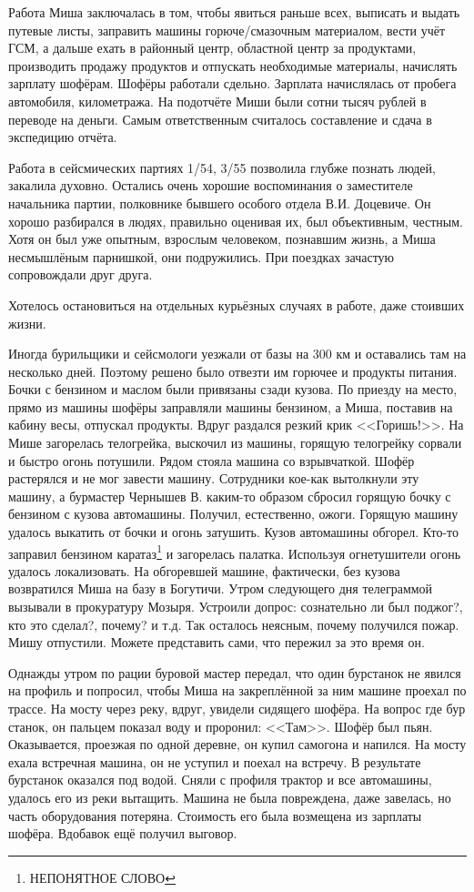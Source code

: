 Работа Миша заключалась в том, чтобы явиться раньше всех, выписать и выдать путевые листы, заправить машины горюче\-/смазочным материалом, вести учёт ГСМ, а дальше ехать в районный центр, областной центр за продуктами, производить продажу продуктов и отпускать необходимые материалы, начислять зарплату шофёрам. Шофёры работали сдельно. Зарплата начислялась от пробега автомобиля, километража. На подотчёте Миши были сотни тысяч рублей в переводе на деньги. Самым ответственным считалось составление и сдача в экспедицию отчёта.

Работа в сейсмических партиях 1/54, 3/55 позволила глубже познать людей, закалила духовно. Остались очень хорошие воспоминания о заместителе начальника партии, полковнике бывшего особого отдела В.И. Доцевиче. Он хорошо разбирался в людях, правильно оценивая их, был объективным, честным. Хотя он был уже опытным, взрослым человеком, познавшим жизнь, а Миша несмышлёным парнишкой, они подружились. При поездках зачастую сопровождали друг друга.

Хотелось остановиться на отдельных курьёзных случаях в работе, даже стоивших жизни. 

Иногда бурильщики и сейсмологи уезжали от базы на 300 км и оставались там на несколько дней. Поэтому решено было отвезти им горючее и продукты питания. Бочки с бензином и маслом были привязаны сзади кузова. По приезду на место, прямо из машины шофёры заправляли машины бензином, а Миша, поставив на кабину весы, отпускал продукты. Вдруг раздался резкий крик <<Горишь!>>. На Мише загорелась телогрейка, выскочил из машины, горящую телогрейку сорвали и быстро огонь потушили. Рядом стояла машина со взрывчаткой. Шофёр растерялся и не мог завести машину. Сотрудники кое-как вытолкнули эту машину, а бурмастер Чернышев В. каким-то образом сбросил горящую бочку с бензином с кузова автомашины. Получил, естественно, ожоги. Горящую машину удалось выкатить от бочки и огонь затушить. Кузов автомашины обгорел. Кто-то заправил бензином каратаз\footnote{НЕПОНЯТНОЕ СЛОВО} и загорелась палатка. Используя огнетушители огонь удалось локализовать. На обгоревшей машине, фактически, без кузова возвратился Миша на базу в Богутичи. Утром следующего дня телеграммой вызывали в прокуратуру Мозыря. Устроили допрос: сознательно ли был поджог?, кто это сделал?, почему? и т.д. Так осталось неясным, почему получился пожар. Мишу отпустили. Можете представить сами, что пережил за это время он.

Однажды утром по рации буровой мастер передал, что один бурстанок не явился на профиль и попросил, чтобы Миша на закреплённой за ним машине проехал по трассе. На мосту через реку, вдруг, увидели сидящего шофёра. На вопрос где бур станок, он пальцем показал воду и проронил: <<Там>>. Шофёр был пьян. Оказывается, проезжая по одной деревне, он купил самогона и напился. На мосту ехала встречная машина, он не уступил и поехал на встречу. В результате бурстанок оказался под водой. Сняли с профиля трактор и все автомашины, удалось его из реки вытащить. Машина не была повреждена, даже завелась, но часть оборудования потеряна. Стоимость его была возмещена из зарплаты шофёра. Вдобавок ещё получил выговор. 

